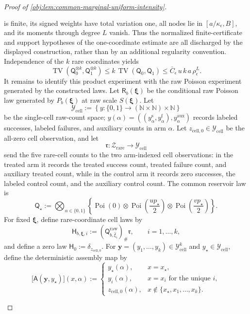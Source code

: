 \documentclass[11pt]{article}
\begin{document}
\begin{proof}[Proof of \cref{obj:lem:common-marginal-uniform-intensity}]
\begin{enumerate}
is finite, its signed weights have total variation one, all nodes lie in
\([a/\kappa_\epsilon,B]\), and its moments through degree \(L\) vanish. Thus the normalized
finite-certificate and support hypotheses of the one-coordinate estimate are all discharged by the
displayed construction, rather than by an additional regularity convention.
Independence of the \(k\) rare coordinates yields
\[
\operatorname{TV}\!\left(\mathsf Q_0^{\otimes k},\mathsf Q_1^{\otimes k}\right)
\le
k\,\operatorname{TV}(\mathsf Q_0,\mathsf Q_1)
\le
\bar C_\epsilon\,u\,k\,a\,\rho_\epsilon^L .
\]
It remains to identify this product experiment with the raw Poisson experiment generated by the constructed laws. Let \(\mathsf R_b(\boldsymbol\xi)\) be the conditional raw Poisson law generated by \(P_b(\boldsymbol\xi)\) at raw scale \(S(\boldsymbol\xi)\). Let
\[
\mathcal Y_{\mathrm{cell}}
:=
\left\{y:\{0,1\}\to(\mathbb N\times\mathbb N)\times\mathbb N\right\}
\]
be the single-cell raw-count space; \(y(\alpha)=((y^{\mathrm{s}}_\alpha,y^{\mathrm{f}}_\alpha),y^{\mathrm{aux}}_\alpha)\) records labeled successes, labeled failures, and auxiliary counts in arm \(\alpha\). Let \(z_{\mathrm{cell},0}\in\mathcal Y_{\mathrm{cell}}\) be the all-zero cell observation, and let
\[
\mathfrak r:\mathcal Z_{\mathrm{rare}}\to\mathcal Y_{\mathrm{cell}}
\]
send the five rare-cell counts to the two arm-indexed cell observations: in the treated arm it records the treated success count, treated failure count, and auxiliary treated count, while in the control arm it records zero successes, the labeled control count, and the auxiliary control count. The common reservoir law is
\[
\mathsf Q_\star
:=
\bigotimes_{\alpha\in\{0,1\}}
\left
\{\operatorname{Poi}(0)\otimes
\operatorname{Poi}\left(\frac{u p_\star}{2}\right)\otimes
\operatorname{Poi}\left(\frac{v p_\star}{2}\right)\right\}.
\]
For fixed \(\boldsymbol\xi\), define rare-coordinate cell laws by
\[
\mathsf H_{b,\boldsymbol\xi,i}
:=
(\mathsf Q^{\mathrm{raw}}_{b,\widehat\xi_i})_\#\mathfrak r,
\qquad i=1,\ldots,k,
\]
and define a zero law \(\mathsf H_0:=\delta_{z_{\mathrm{cell},0}}\). For \(\boldsymbol y=(y_1,\ldots,y_k)\in\mathcal Y_{\mathrm{cell}}^k\) and \(y_\star\in\mathcal Y_{\mathrm{cell}}\), define the deterministic assembly map by
\[
\bigl[\mathsf A(\boldsymbol y,y_\star)\bigr](x,\alpha)
:=
\begin{cases}
y_\star(\alpha), & x=x_\star,\\
y_i(\alpha), & x=x_i\text{ for the unique }i,\\
z_{\mathrm{cell},0}(\alpha), & x\notin\{x_\star,x_1,\ldots,x_k\}.

\end{cases}\]
\end{enumerate}
\end{proof}
\end{document}
